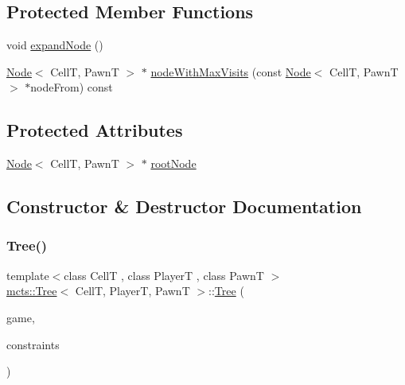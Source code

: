 \subsection*{Protected Member Functions}
\begin{DoxyCompactItemize}
\item 
void \hyperlink{classmcts_1_1_tree_a4cdd4b2dc809c29fe376dc251155d2cf}{expand\+Node} ()
\item 
\hyperlink{structmcts_1_1_node}{Node}$<$ CellT, PawnT $>$ $\ast$ \hyperlink{classmcts_1_1_tree_a2cf4616df96cb68014ebd8fa6d0aebc4}{node\+With\+Max\+Visits} (const \hyperlink{structmcts_1_1_node}{Node}$<$ CellT, PawnT $>$ $\ast$node\+From) const
\end{DoxyCompactItemize}
\subsection*{Protected Attributes}
\begin{DoxyCompactItemize}
\item 
\hyperlink{structmcts_1_1_node}{Node}$<$ CellT, PawnT $>$ $\ast$ \hyperlink{classmcts_1_1_tree_a96e2576ffcf962ad46140e100586ca81}{root\+Node}
\end{DoxyCompactItemize}


\subsection{Constructor \& Destructor Documentation}
\mbox{\label{classmcts_1_1_tree_aa0f841a62bc4884486260200fb1bef10}} 
\subsubsection{\texorpdfstring{Tree()}{Tree()}}
{\footnotesize\ttfamily template$<$class CellT , class PlayerT , class PawnT $>$ \\
\hyperlink{classmcts_1_1_tree}{mcts\+::\+Tree}$<$ CellT, PlayerT, PawnT $>$\+::\hyperlink{classmcts_1_1_tree}{Tree} (\begin{DoxyParamCaption}\item[{\hyperlink{classgame_1_1_abstract_game}{game\+::\+Abstract\+Game}$<$ CellT, PlayerT, PawnT $>$ $\ast$const \&}]{game,  }\item[{const \hyperlink{structmcts_1_1_m_c_t_s_constraints}{M\+C\+T\+S\+Constraints} \&}]{constraints }\end{DoxyParamCaption})\hspace{0.3cm}{\ttfamily [explicit]}}

